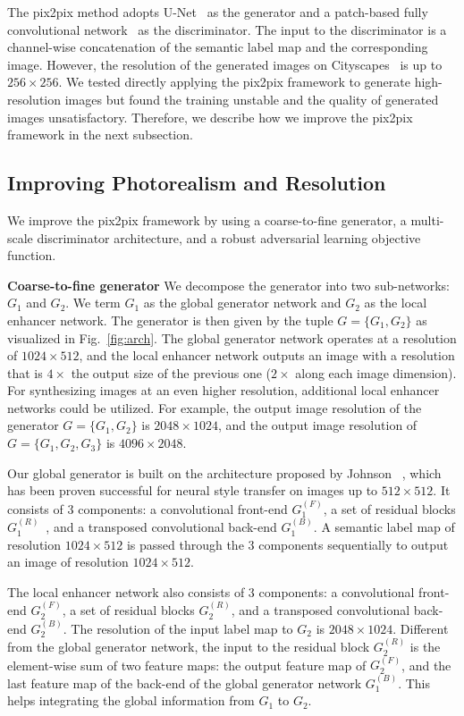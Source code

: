 The pix2pix method adopts U-Net~\cite{ronneberger2015u} as the generator and a patch-based fully convolutional network~\cite{long2015fully} as the discriminator. The input to the discriminator is a channel-wise concatenation of the semantic label map and the corresponding image. However, the resolution of the generated images on Cityscapes~\cite{Cordts2016cityscapes} is up to $256\times 256$. We tested directly applying the pix2pix framework to generate high-resolution images but found the training unstable and the quality of generated images unsatisfactory. Therefore, we describe how we improve the pix2pix framework in the next subsection.

\subsection{Improving Photorealism and Resolution} \label{sec:alg:resolution}
We improve the pix2pix framework by using a coarse-to-fine generator, a multi-scale discriminator architecture, and a robust adversarial learning objective function.

 {\bf Coarse-to-fine generator} We decompose the generator into two sub-networks: $G_1$ and $G_2$. We term $G_1$ as the global generator network and $G_2$ as the local enhancer network. The generator is then given by the tuple  $G=\{G_1,G_2\}$ as visualized in Fig.~\ref{fig:arch}. The global generator network operates at a resolution of $1024\times 512$, and the local enhancer network outputs an image with a resolution that is $4\times$ the output size of the previous one ($2\times$ along each image dimension). For synthesizing images at an even higher resolution, additional local enhancer networks could be utilized. For example, the output image resolution of the generator $G=\{G_1, G_2\}$ is $2048\times 1024$, and the output image resolution of $G=\{G_1, G_2, G_3\}$ is $4096\times 2048$.

Our global generator is built on the architecture proposed by Johnson \etal~\cite{johnson2016perceptual}, which has been proven successful for neural style transfer on images up to $512\times 512$. It consists of $3$ components: a convolutional front-end $G_1^{(F)}$, a set of residual blocks $G_1^{(R)}$~\cite{he2016deep}, and a transposed convolutional back-end $G_1^{(B)}$. A semantic label map of resolution $1024\times 512$ is passed through the 3 components sequentially to output an image of resolution $1024\times 512$.

The local enhancer network also consists of 3 components: a convolutional front-end $G_2^{(F)}$, a set of residual blocks $G_2^{(R)}$, and a transposed convolutional back-end $G_2^{(B)}$. The resolution of the input label map to $G_2$ is $2048\times 1024$. Different from the global generator network, the input to the residual block $G_2^{(R)}$ is the element-wise sum of two feature maps: the output feature map of $G_2^{(F)}$, and the last feature map of the back-end of the global generator network $G_1^{(B)}$. This helps integrating the global information from $G_1$ to $G_2$. 

